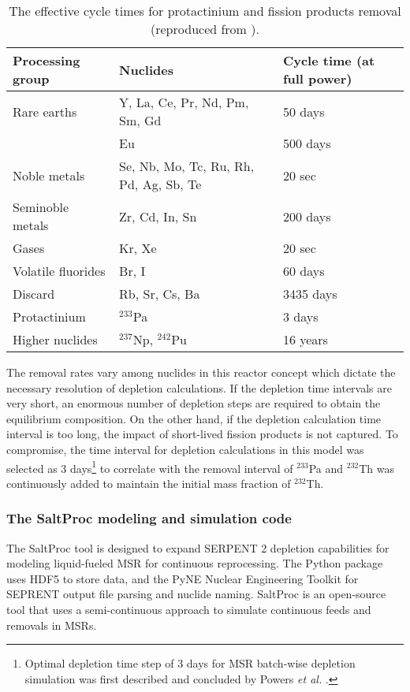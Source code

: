 \begin{table}[ht!]
        \centering
        \caption{The effective cycle times for protactinium and fission 
        products removal (reproduced from \cite{robertson_conceptual_1971}).}
        \begin{tabularx}{\textwidth}{ x | s | x }
        \hline Processing group & \qquad\qquad\qquad Nuclides & Cycle time (at 
                full power) \\ \hline Rare earths & Y, La, Ce, Pr, Nd, Pm, Sm, 
                Gd & 50 days \\ \qquad & Eu & 500 days \\ Noble metals & Se, 
                Nb, Mo, Tc, Ru, Rh, Pd, Ag, Sb, Te & 20 sec \\
        Seminoble metals & Zr, Cd, In, Sn & 200 days \\
        Gases & Kr, Xe & 20 sec \\ Volatile fluorides & Br, I & 60 days \\
        Discard & Rb, Sr, Cs, Ba & 3435 days \\ 
        Protactinium & $^{233}$Pa & 3 days \\ Higher 
                nuclides & $^{237}$Np, $^{242}$Pu & 16 years \\  \hline
        \end{tabularx}
        \label{tab:reprocessing_list}
\end{table}
The removal rates vary among nuclides in this reactor concept which dictate the 
necessary resolution of depletion calculations. If the depletion time intervals 
are very short, an enormous number of depletion steps are required to obtain 
the equilibrium composition. On the other hand, if the depletion  calculation 
time interval is too long, the impact of short-lived fission products is not 
captured. To compromise, the time interval for depletion calculations in this 
model was selected as 3 days\footnote{ Optimal depletion time step of 3 days for \gls{MSR} batch-wise depletion simulation was first described and concluded by Powers \emph{et al.} \cite{powers_new_2013}.} to correlate with the removal interval of 
$^{233}$Pa and $^{232}$Th was continuously added to maintain the initial mass 
fraction of $^{232}$Th.

\subsubsection{The SaltProc modeling and simulation code}
The SaltProc tool \cite{rykhlevskii_arfc/saltproc:_2018} is designed to 
expand SERPENT 2
 depletion capabilities for modeling liquid-fueled \gls{MSR} for continuous 
 reprocessing.
The Python package uses HDF5 \cite{the_hdf_group_hierarchical_1997} to store 
data, and the PyNE Nuclear Engineering Toolkit \cite{scopatz_pyne:_2012}
for SEPRENT output file parsing and nuclide naming. SaltProc is an open-source tool 
that uses a semi-continuous approach to simulate continuous feeds and removals 
in \glspl{MSR}. 

